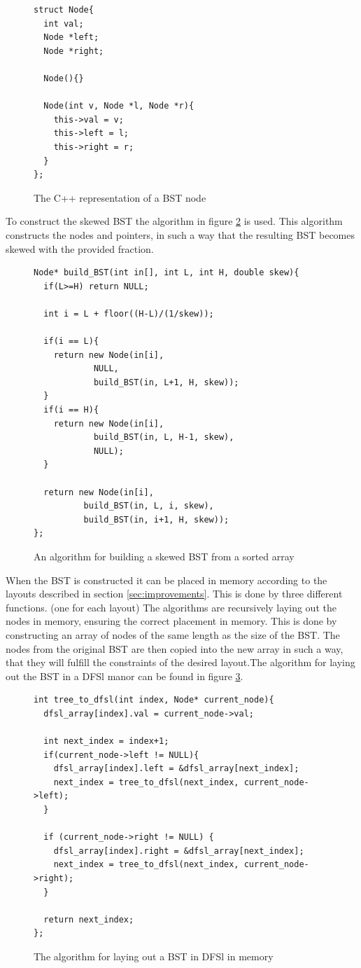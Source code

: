 \documentclass{article}
\begin{document}
\begin{figure}[H]
	\centering
	\begin{lstlisting}
struct Node{
  int val;
  Node *left;
  Node *right;

  Node(){}
  
  Node(int v, Node *l, Node *r){
    this->val = v;
    this->left = l;
    this->right = r;
  }
};
	\end{lstlisting}
	\caption{The C++ representation of a BST node}
	\label{code:node}
\end{figure}

To construct the skewed BST the algorithm in figure \ref{code:build_bst} is used. This algorithm constructs the nodes and pointers, in such a way that the resulting BST becomes skewed with the provided fraction.

\begin{figure}[H]
	\centering
	\begin{lstlisting}
Node* build_BST(int in[], int L, int H, double skew){
  if(L>=H) return NULL;

  int i = L + floor((H-L)/(1/skew));

  if(i == L){
    return new Node(in[i],
		    NULL,
		    build_BST(in, L+1, H, skew));
  }
  if(i == H){
    return new Node(in[i],
		    build_BST(in, L, H-1, skew),
		    NULL);
  }
  
  return new Node(in[i],
		  build_BST(in, L, i, skew),
		  build_BST(in, i+1, H, skew));
};
	\end{lstlisting}
	\caption{An algorithm for building a skewed BST from a sorted array}
	\label{code:build_bst}
\end{figure}

When the BST is constructed it can be placed in memory according to the layouts described in section \ref{sec:improvements}. This is done by three different functions. (one for each layout) The algorithms are recursively laying out the nodes in memory, ensuring the correct placement in memory. This is done by constructing an array of nodes of the same length as the size of the BST. The nodes from the original BST are then copied into the new array in such a way, that they will fulfill the constraints of the desired layout.The algorithm for laying out the BST in a DFSl manor can be found in figure \ref{code:dfsl_layout}.

\begin{figure}[H]
	\centering
	\begin{lstlisting}
int tree_to_dfsl(int index, Node* current_node){
  dfsl_array[index].val = current_node->val;

  int next_index = index+1;
  if(current_node->left != NULL){
    dfsl_array[index].left = &dfsl_array[next_index];
    next_index = tree_to_dfsl(next_index, current_node->left);
  }
  
  if (current_node->right != NULL) {
    dfsl_array[index].right = &dfsl_array[next_index];
    next_index = tree_to_dfsl(next_index, current_node->right);
  }

  return next_index;
};
	\end{lstlisting}
	\caption{The algorithm for laying out a BST in DFSl in memory}
	\label{code:dfsl_layout}
\end{figure}
\end{document}
